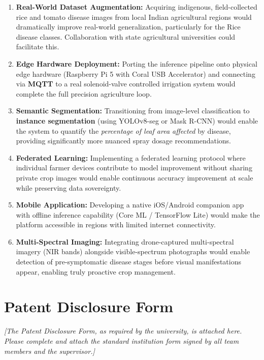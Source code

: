 \documentclass[12pt,a4paper]{report}
\begin{document}
\begin{enumerate}
  \item \textbf{Real-World Dataset Augmentation:} Acquiring indigenous, field-collected rice and tomato disease images from local Indian agricultural regions would dramatically improve real-world generalization, particularly for the Rice disease classes. Collaboration with state agricultural universities could facilitate this.

  \item \textbf{Edge Hardware Deployment:} Porting the inference pipeline onto physical edge hardware (Raspberry Pi 5 with Coral USB Accelerator) and connecting via \textbf{MQTT} to a real solenoid-valve controlled irrigation system would complete the full precision agriculture loop.

  \item \textbf{Semantic Segmentation:} Transitioning from image-level classification to \textbf{instance segmentation} (using YOLOv8-seg or Mask R-CNN) would enable the system to quantify the \textit{percentage of leaf area affected} by disease, providing significantly more nuanced spray dosage recommendations.

  \item \textbf{Federated Learning:} Implementing a federated learning protocol where individual farmer devices contribute to model improvement without sharing private crop images would enable continuous accuracy improvement at scale while preserving data sovereignty.

  \item \textbf{Mobile Application:} Developing a native iOS/Android companion app with offline inference capability (Core ML / TensorFlow Lite) would make the platform accessible in regions with limited internet connectivity.

  \item \textbf{Multi-Spectral Imaging:} Integrating drone-captured multi-spectral imagery (NIR bands) alongside visible-spectrum photographs would enable detection of pre-symptomatic disease stages before visual manifestations appear, enabling truly proactive crop management.
\end{enumerate}

\newpage

\appendix

\chapter{Patent Disclosure Form}
\textit{[The Patent Disclosure Form, as required by the university, is attached here. Please complete and attach the standard institution form signed by all team members and the supervisor.]}
\end{document}
